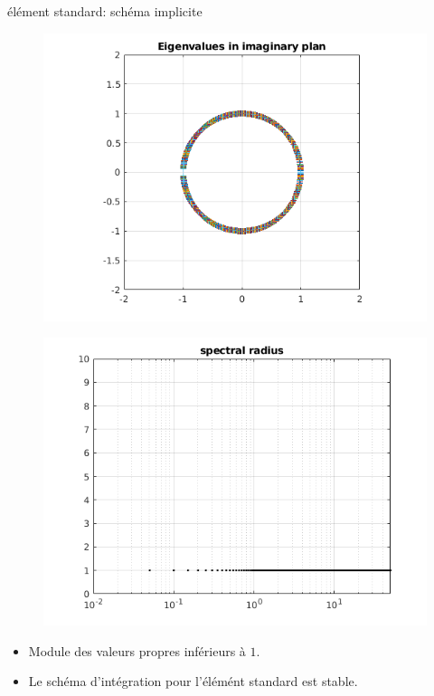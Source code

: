 \begin{frame}{élément standard: schéma implicite}
\begin{figure}[ht] 
  \label{ fig7} 
  \begin{minipage}[b]{0.5\linewidth}
    \centering
    \includegraphics[scale=.35]{images/eig_imp_st.png} \\

  \end{minipage}%
  \begin{minipage}[b]{0.5\linewidth}
    \centering
    \includegraphics[scale=.35]{images/sr_imp_st.png} \\
  \end{minipage} 
\end{figure}
\begin{itemize}
\item Module des valeurs propres inférieurs à $1$.
\item Le schéma d'intégration pour l'élémént standard est stable.
\end{itemize}
\end{frame}

